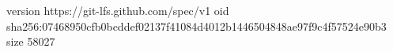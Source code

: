 version https://git-lfs.github.com/spec/v1
oid sha256:07468950cfb0bcddef02137f41084d4012b1446504848ae97f9c4f57524e90b3
size 58027

